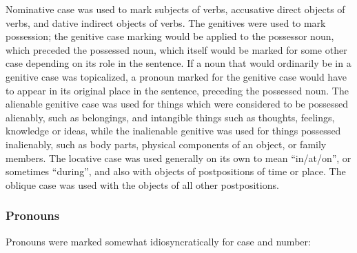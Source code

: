 \documentclass{article}
\begin{document}
Nominative case was used to mark subjects of verbs, accusative direct objects of verbs, and dative indirect objects of verbs.  The genitives were used to mark possession; the genitive case marking would be applied to the possessor noun, which preceded the possessed noun, which itself would be marked for some other case depending on its role in the sentence.  If a noun that would ordinarily be in a genitive case was topicalized, a pronoun marked for the genitive case would have to appear in its original place in the sentence, preceding the possessed noun.  The alienable genitive case was used for things which were considered to be possessed alienably, such as belongings, and intangible things such as thoughts, feelings, knowledge or ideas, while the inalienable genitive was used for things possessed inalienably, such as body parts, physical components of an object, or family members.  The locative case was used generally on its own to mean ``in/at/on'', or sometimes ``during'', and also with objects of postpositions of time or place.  The oblique case was used with the objects of all other postpositions.

\newpage

\subsubsection{Pronouns}

Pronouns were marked somewhat idiosyncratically for case and number:
\end{document}
